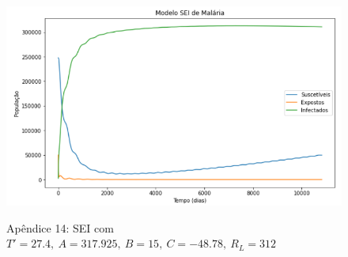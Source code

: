 \documentclass[12pt]{article}
\begin{document}
\begin{figure}[!ht]
        \centering
        \hbox{\hspace{3.5em} \includegraphics[scale=0.6] {SEI_Correcao_max_T_linha.png}}
        \caption*{Apêndice 14: SEI com $T'=27.4, \ A=317.925, \ B=15, \ C=-48.78, \ R_L=312$}
\end{figure}

\newpage
\end{document}
